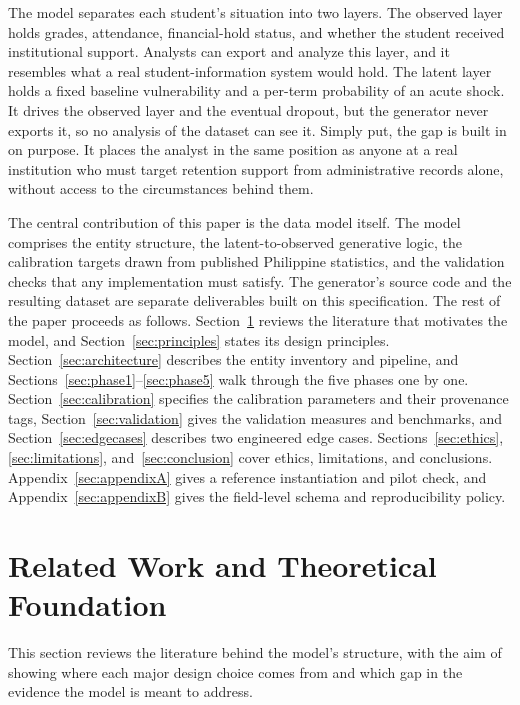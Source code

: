 \documentclass[11pt]{article}
\begin{document}
The model separates each student's situation into two layers. The observed layer holds grades, attendance, financial-hold status, and whether the student received institutional support. Analysts can export and analyze this layer, and it resembles what a real student-information system would hold. The latent layer holds a fixed baseline vulnerability and a per-term probability of an acute shock. It drives the observed layer and the eventual dropout, but the generator never exports it, so no analysis of the dataset can see it. Simply put, the gap is built in on purpose. It places the analyst in the same position as anyone at a real institution who must target retention support from administrative records alone, without access to the circumstances behind them.

The central contribution of this paper is the data model itself. The model comprises the entity structure, the latent-to-observed generative logic, the calibration targets drawn from published Philippine statistics, and the validation checks that any implementation must satisfy. The generator's source code and the resulting dataset are separate deliverables built on this specification. The rest of the paper proceeds as follows. Section~\ref{sec:related} reviews the literature that motivates the model, and Section~\ref{sec:principles} states its design principles. Section~\ref{sec:architecture} describes the entity inventory and pipeline, and Sections~\ref{sec:phase1}--\ref{sec:phase5} walk through the five phases one by one. Section~\ref{sec:calibration} specifies the calibration parameters and their provenance tags, Section~\ref{sec:validation} gives the validation measures and benchmarks, and Section~\ref{sec:edgecases} describes two engineered edge cases. Sections~\ref{sec:ethics}, \ref{sec:limitations}, and~\ref{sec:conclusion} cover ethics, limitations, and conclusions. Appendix~\ref{sec:appendixA} gives a reference instantiation and pilot check, and Appendix~\ref{sec:appendixB} gives the field-level schema and reproducibility policy.

\FloatBarrier
\section{Related Work and Theoretical Foundation}
\label{sec:related}

\hspace*{\parindent}This section reviews the literature behind the model's structure, with the aim of showing where each major design choice comes from and which gap in the evidence the model is meant to address.
\end{document}
